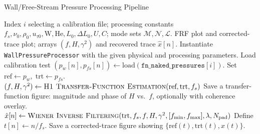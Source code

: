 \documentclass[a4paper,11pt]{article}
\begin{document}
\begin{algorithm}
\caption{Wall/Free-Stream Pressure Processing Pipeline}
    \label{alg:pipeline}
    \begin{algorithmic}[1]
        \Require Index $i$ selecting a calibration file; processing constants $f_s,\nu_0,\rho_0,u_{\tau 0},\mathrm{W},\mathrm{He},L_0,\Delta L_0,U,C$; mode sets $\mathcal{M},\mathcal{N},\mathcal{L}$.
        \Ensure FRF plot and corrected-trace plot; arrays $(f,H,\gamma^2)$ and recovered trace $\hat{x}[n]$.
        \State Instantiate \texttt{WallPressureProcessor} with the given physical and processing parameters.
        \State Load calibration test $ (p_w[n], p_{fs}[n]) \leftarrow \text{load}(\texttt{fn\_naked\_pressures}[i])$.
        \State Set $\text{ref}\gets p_w,\;\text{trt}\gets p_{fs}$.
        \State $(f,H,\gamma^2) \gets \textsc{H1 Transfer-Function Estimation}(\text{ref}, \text{trt}, f_s)$ 
        \State Save a transfer-function figure: magnitude and phase of $H$ vs.\ $f$, optionally with coherence overlay.
        \State $\hat{x}[n] \gets \textsc{Wiener Inverse Filtering}(\text{trt}, f_s, f, H, \gamma^2, [f_{\min}, f_{\max}], \lambda, N_{\mathrm{pad}})$ 
        \State Define $t[n] \gets n/f_s$.
        \State Save a corrected-trace figure showing $ \{\text{ref}(t), \text{trt}(t), \hat{x}(t)\}$.
    \end{algorithmic}
\end{algorithm}
\end{document}
